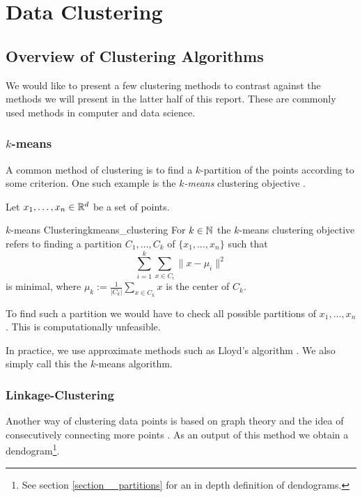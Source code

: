 \chapter{Data Clustering}

\section{Overview of Clustering Algorithms}
We would like to present a few clustering methods to contrast against the methods we will present in the latter half of this report. These are commonly used methods in computer and data science.

\subsection{$k$-means}
A common method of clustering is to find a $k$-partition of the points according to some criterion.
One such example is the \emph{$k$-means} clustering objective \cite[Section~3.1]{Scitovski2021}.

Let $x_1, \dots, x_n \in \mathbb R^d$ be a set of points.

\begin{definition}{$k$-means Clustering}{kmeans_clustering}
For $k \in \mathbb N$ the $k$-means clustering objective refers to finding a partition $C_1, \dots, C_k$ of $\{x_1, \dots, x_n\}$ such that
\begin{equation*}
\label{eq:kmean_optimization}
    \sum_{i = 1}^k \sum_{x \in C_i} \|x - \mu_i\|^2
\end{equation*}
is minimal, where $\mu_k := \frac{1}{|C_k|}\sum_{x \in C_k} x$ is the center of $C_k$.
\end{definition}
To find such a partition we would have to check all possible partitions of $x_1, \dots, x_n$. This is computationally unfeasible.

In practice, we use approximate methods such as Lloyd's algorithm \cite[Section~3.1.2]{Scitovski2021}.
We also simply call this the $k$-means algorithm.

\subsection{Linkage-Clustering}
\label{section__linkage_clustering}
Another way of clustering data points is based on graph theory and the idea of consecutively connecting more points \cite[Section~4.2.2]{Everitt2011}.
As an output of this method we obtain a
dendogram\footnote{See section \ref{section__partitions} for an in depth definition of dendograms.}.

